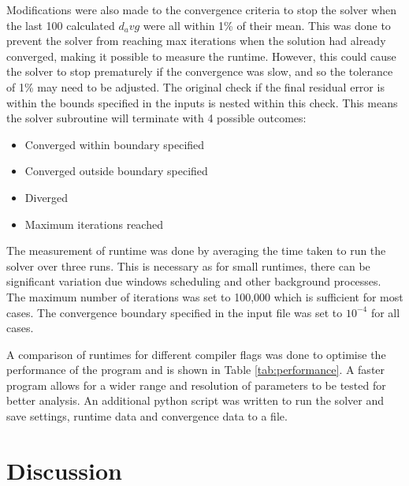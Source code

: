 \documentclass{article}
\begin{document}
Modifications were also made to the convergence criteria to stop the solver when the last 100 calculated $d_avg$ were all within 1\% of their mean.
This was done to prevent the solver from reaching max iterations when the solution had already converged, making it possible to measure the runtime.
However, this could cause the solver to stop prematurely if the convergence was slow, and so the tolerance of 1\% may need to be adjusted.
The original check if the final residual error is within the bounds specified in the inputs is nested within this check.
This means the solver subroutine will terminate with 4 possible outcomes:
\begin{itemize}
    \item Converged within boundary specified
    \item Converged outside boundary specified
    \item Diverged
    \item Maximum iterations reached
\end{itemize}

The measurement of runtime was done by averaging the time taken to run the solver over three runs.
This is necessary as for small runtimes, there can be significant variation due windows scheduling and other background processes.
The maximum number of iterations was set to 100,000 which is sufficient for most cases.
The convergence boundary specified in the input file was set to $10^{-4}$ for all cases.

A comparison of runtimes for different compiler flags was done to optimise the performance of the program and is shown in Table \ref{tab:performance}.
A faster program allows for a wider range and resolution of parameters to be tested for better analysis.
An additional python script was written to run the solver and save settings, runtime data and convergence data to a file.


\section{Discussion}


\end{document}
